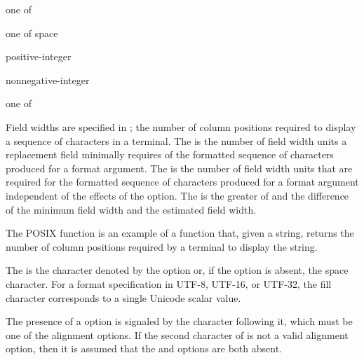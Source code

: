 \begin{ncbnf}
 \textnormal{one of}\br
    \terminal{< > \caret}
\end{ncbnf}

\begin{ncbnf}
 \textnormal{one of}\br
    \terminal{+ -} \textnormal{space}
\end{ncbnf}

\begin{ncbnf}
\br
    positive-integer\br
    \terminal{\{}  \terminal{\}}
\end{ncbnf}

\begin{ncbnf}
\br
     nonnegative-integer\br
     \terminal{\{}  \terminal{\}}
\end{ncbnf}

\begin{ncbnf}
 \textnormal{one of}\br
\end{ncbnf}

\pnum
Field widths are specified in ;
the number of column positions required to display a sequence of
characters in a terminal.
The 
is the number of field width units a replacement field minimally requires of
the formatted sequence of characters produced for a format argument.
The  is the number of field width units
that are required for the formatted sequence of characters
produced for a format argument independent of
the effects of the  option.
The  is the greater of  and
the difference of the minimum field width and the estimated field width.

\begin{note}
The POSIX  function is an example of a function that,
given a string, returns the number of column positions required by
a terminal to display the string.
\end{note}

\pnum
The  is the character denoted by
the  option or,
if the  option is absent, the space character.
For a format specification in UTF-8, UTF-16, or UTF-32,
the fill character corresponds to a single Unicode scalar value.
\begin{note}
The presence of a  option
is signaled by the character following it,
which must be one of the alignment options.
If the second character of 
is not a valid alignment option,
then it is assumed that
the  and  options
are both absent.
\end{note}

